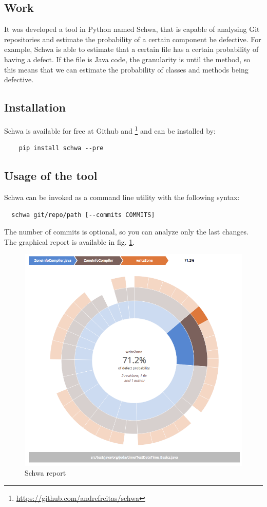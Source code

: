\documentclass[9pt,a4paper]{extarticle}
\begin{document}
\begin{multicols}{2}
\section{Work}\label{sec:work}
It was developed a tool in Python named Schwa, that is capable
of analysing Git repositories and estimate the probability of a certain component
be defective. For example, Schwa is able to estimate that a certain file has
a certain probability of having a defect. If the file is Java code, the granularity
is until the method, so this means that we can estimate the probability of classes
and methods being defective.

\subsection{Installation}
Schwa is available for free at Github and
\footnote{\url{https://github.com/andrefreitas/schwa}} and can be installed by:
\begin{verbatim}
    pip install schwa --pre
\end{verbatim}

\subsection{Usage of the tool}
Schwa can be invoked as a command line utility with the following syntax:

\begin{verbatim}
  schwa git/repo/path [--commits COMMITS]
\end{verbatim}

The number of commits is optional, so you can analyze only the last changes. The
graphical report is available in fig. \ref{fig:sunburst}.

\begin{figure}[H]
\centerline{\includegraphics[scale=.25]{sunburst.png}}
\caption{Schwa report}
\label{fig:sunburst}
\end{figure}


\end{multicols}
\end{document}
